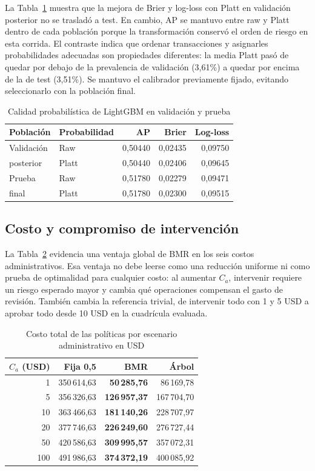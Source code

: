 \documentclass[conference,letterpaper]{IEEEtran}
\newcommand{\Ca}{C_a}
\begin{document}
La Tabla~\ref{tab:prob} muestra que la mejora de Brier y log-loss con Platt en validación posterior no se trasladó a test. En cambio, AP se mantuvo entre raw y Platt dentro de cada población porque la transformación conservó el orden de riesgo en esta corrida. El contraste indica que ordenar transacciones y asignarles probabilidades adecuadas son propiedades diferentes: la media Platt pasó de quedar por debajo de la prevalencia de validación (3,61\%) a quedar por encima de la de test (3,51\%). Se mantuvo el calibrador previamente fijado, evitando seleccionarlo con la población final.

\begin{table}[t]
\caption{Calidad probabilística de LightGBM en validación y prueba}
\label{tab:prob}\centering\small
\begin{tabular}{llrrr}\toprule
Población & Probabilidad & AP & Brier & Log-loss\\\midrule
Validación & Raw & 0,50440 & 0,02435 & 0,09750\\
posterior & Platt & 0,50440 & 0,02406 & 0,09645\\
Prueba & Raw & 0,51780 & 0,02279 & 0,09471\\
final & Platt & 0,51780 & 0,02300 & 0,09515\\\bottomrule
\end{tabular}
\end{table}

\subsection{Costo y compromiso de intervención}
La Tabla~\ref{tab:costs} evidencia una ventaja global de BMR en los seis costos administrativos. Esa ventaja no debe leerse como una reducción uniforme ni como prueba de optimalidad para cualquier costo: al aumentar $\Ca$, intervenir requiere un riesgo esperado mayor y cambia qué operaciones compensan el gasto de revisión. También cambia la referencia trivial, de intervenir todo con 1 y 5 USD a aprobar todo desde 10 USD en la cuadrícula evaluada.

\begin{table}[t]
\caption{Costo total de las políticas por escenario administrativo en USD}
\label{tab:costs}\centering\small
\begin{tabular}{rrrr}\toprule
$\Ca$ (USD) & Fija 0,5 & BMR & Árbol\\\midrule
1 & 350\,614,63 & \textbf{50\,285,76} & 86\,169,78 \\
5 & 356\,326,63 & \textbf{126\,957,37} & 167\,704,70 \\
10 & 363\,466,63 & \textbf{181\,140,26} & 228\,707,97 \\
20 & 377\,746,63 & \textbf{226\,249,60} & 276\,727,44 \\
50 & 420\,586,63 & \textbf{309\,995,57} & 357\,072,31 \\
100 & 491\,986,63 & \textbf{374\,372,19} & 400\,085,92 \\
\bottomrule\end{tabular}
\end{table}
\end{document}
